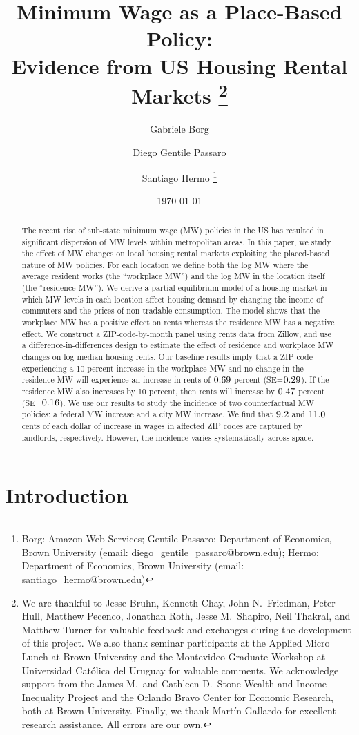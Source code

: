 \documentclass{article}
\title{ Minimum Wage as a Place-Based Policy: \\
        Evidence from US Housing Rental Markets%
        \thanks{We are thankful to Jesse Bruhn, Kenneth Chay, John N.\ Friedman, 
        Peter Hull, Matthew Pecenco, Jonathan Roth, Jesse M.\ Shapiro, 
        Neil Thakral, and Matthew Turner
        for valuable feedback and exchanges during the development of 
        this project.
        We also thank seminar participants at the Applied Micro Lunch at Brown
        University and the Montevideo Graduate Workshop at Universidad Católica 
        del Uruguay for valuable comments.
        We acknowledge support from 
        the James M.\ and Cathleen D.\ Stone 
        Wealth and Income Inequality Project and 
        the Orlando Bravo Center for Economic Research, both at Brown University.
        Finally, we thank Martín Gallardo for excellent research assistance.
        All errors are our own.}}
\author{Gabriele Borg \and Diego Gentile Passaro \and Santiago Hermo%
        \footnote{Borg: Amazon Web Services;
        Gentile Passaro: Department of Economics, Brown University 
        (email: \url{diego_gentile_passaro@brown.edu}); 
        Hermo: Department of Economics, Brown University 
        (email: \url{santiago_hermo@brown.edu})}}
\date{\today}
\begin{document}
\maketitle

\begin{abstract}
    \noindent
    The recent rise of sub-state minimum wage (MW) policies in the US has 
    resulted in significant dispersion of MW levels within metropolitan areas.
    In this paper, we study the effect of MW changes on local housing rental 
    markets exploiting the placed-based nature of MW policies.
    For each location we define both
    the log MW where the average resident works (the ``workplace MW'')
    and the log MW in the location itself (the ``residence MW'').
    We derive a partial-equilibrium model of a housing market
    in which MW levels in each location affect housing demand by 
    changing the income of commuters and the prices of non-tradable consumption.
    The model shows that the workplace MW has a positive effect on rents 
    whereas the residence MW has a negative effect.
    We construct a ZIP-code-by-month panel using rents data from Zillow, and
    use a difference-in-differences design to estimate the effect of 
    residence and workplace MW changes on log median housing rents.
    Our baseline results imply that a ZIP code experiencing a 
    10 percent increase in the workplace MW and 
    no change in the residence MW will experience an increase in rents 
    of $\textnormal{0.69}$ percent (SE=$\textnormal{0.29}$).
    If the residence MW also increases by 10 percent, then 
    rents will increase by $\textnormal{0.47}$ percent (SE=$\textnormal{0.16}$).
    We use our results to study the incidence of two counterfactual MW policies:
    a federal MW increase and a city MW increase.
    We find that $\textnormal{9.2}$ and $\textnormal{11.0}$ 
    cents of each dollar of increase in wages in affected ZIP codes are captured 
    by landlords, respectively.
    However, the incidence varies systematically across space.
\end{abstract}

\vspace{5mm}


\clearpage

\section{Introduction}\label{sec:intro}
    
\end{document}
